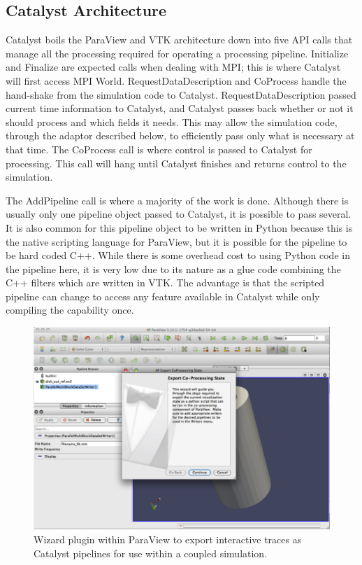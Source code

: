 \subsection{Catalyst Architecture}

Catalyst boils the ParaView and VTK architecture down into five API calls that
manage all the processing required for operating a processing pipeline.
Initialize and Finalize are expected calls when dealing with MPI; this is where
Catalyst will first access MPI World.  RequestDataDescription and CoProcess
handle the hand-shake from the simulation code to Catalyst.
RequestDataDescription passed current time information to Catalyst, and
Catalyst passes back whether or not it should process and which fields it
needs.  This may allow the simulation code, through the adaptor described
below, to efficiently pass only what is necessary at that time.  The CoProcess
call is where control is passed to Catalyst for processing.  This call will
hang until Catalyst finishes and returns control to the simulation.

The AddPipeline call is where a majority of the work is done.  Although there
is usually only one pipeline object passed to Catalyst, it is possible to pass
several.  It is also common for this pipeline object to be written in Python
because this is the native scripting language for ParaView, but it is possible
for the pipeline to be hard coded C++.  While there is some overhead cost to
using Python code in the pipeline here, it is very low due to its nature as a
glue code combining the C++ filters which are written in VTK.  The advantage is
that the scripted pipeline can change to access any feature available in
Catalyst while only compiling the capability once.

\begin{figure}[htb]
  \centering
  \includegraphics{figures/ScriptExport}
  \caption{Wizard plugin within ParaView to export interactive traces as 
Catalyst pipelines for use within a coupled simulation.}
  \label{fig:ScriptExport}
\end{figure}

